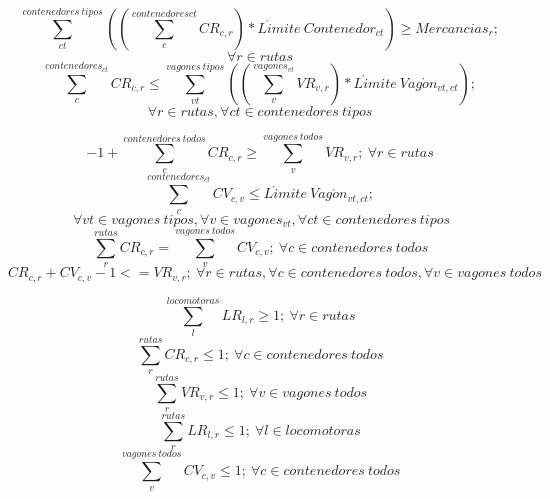 \documentclass[11pt,spanish]{article}
\begin{document}
			$$
				\sum_{ct}^{contenedores\ tipos}\left(\left( \sum_c^{contenedores{ct}} CR_{c,r} \right) * L\acute{i}mite\ Contenedor_{ct} \right) \geq  Mercancias_r;
			$$
			\begin{equation}
				\label{eq:SatisfaceMercancias}
				\forall r \in rutas
			\end{equation}
			$$
				\sum_c^{contenedores_{ct}} CR_{c,r} \leq \sum_{vt}^{vagones\ tipos} \left( \left(\sum_v^{vagones_{vt}}VR_{v,r}\right)*L\acute{i}mite\ Vag\acute{o}n_{vt,ct} \right);
			$$
			\begin{equation}
				\label{eq:RutaCumpleLimitesContenedores}
				\forall r \in rutas,\forall ct \in contenedores\ tipos
			\end{equation}
			
			\begin{equation}
				\label{eq:EvitaUsoInnecesario}
				-1+\sum_c^{contenedores\ todos} CR_{c,r} \geq \sum_v^{vagones\ todos} VR_{v,r};\ \forall r \in rutas
			\end{equation}
			$$
			\sum_c^{contenedores_{ct}}CV_{c,v} \leq L\acute{i}mite\ Vag\acute{o}n_{vt,ct};
			$$
			\begin{equation}
				\label{eq:VagonesCumplenLimitesContenedores}
				\ \forall vt \in vagones\ tipos, \forall v \in vagones_{vt}, \forall ct \in contenedores\ tipos
			\end{equation}
			\begin{equation}
				\label{eq:CoherenciaTotalidadContenedores}
				\sum_r^{rutas} CR_{c,r} = \sum_v^{vagones\ todos} CV_{c,v};\ \forall c \in contenedores\ todos
			\end{equation}
			\begin{equation}
				\label{eq:Coherencia_CV_CR}
				CR_{c,r}+CV_{c,v}-1<=VR_{v,r};\ \forall r \in rutas, \forall c \in contenedores\ todos, \forall v \in vagones\ todos
			\end{equation}


			\begin{equation}
				\label{eq:alMenosUnaLocomotoraPorRuta}
				\sum_l^{locomotoras}LR_{l,r} \geq 1;\ \forall r \in rutas
			\end{equation}
			\begin{equation}
				\label{eq:unaRutaPorContenedor}
				\sum_r^{rutas}CR_{c,r} \leq 1;\ \forall c \in contenedores\ todos
			\end{equation}
			\begin{equation}
				\label{eq:unaRutaPorVagon}
				\sum_r^{rutas}VR_{v,r} \leq 1;\ \forall v \in vagones\ todos
			\end{equation}
			\begin{equation}
				\label{eq:unaRutaPorLocomotora}
				\sum_r^{rutas} LR_{l,r} \leq 1;\ \forall l \in locomotoras
			\end{equation}
			\begin{equation}
				\label{eq:unVagonPorContenedor}
				\sum_v^{vagones\ todos}CV_{c,v} \leq 1;\ \forall c \in contenedores\ todos
			\end{equation}
\end{document}
